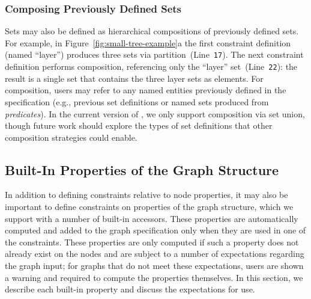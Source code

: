 \subsubsection{Composing Previously Defined Sets}
Sets may also be defined as hierarchical
compositions of previously defined sets. For example, in
Figure~\ref{fig:small-tree-example}a the first constraint definition
(named ``layer'') produces three sets via
partition~(Line~\texttt{17}). The next constraint definition performs 
composition, referencing only the ``layer'' set~(Line~\texttt{22}): the result
is a single set that contains the three layer sets as elements.
For composition, users may
refer to any named entities previously defined in the specification (e.g.,
previous set definitions or named sets produced from \emph{predicates}).
In the current version of \projectname, we only support composition via
set union, though future work should explore the types of set definitions
that other composition strategies could enable.

\subsection{Built-In Properties of the Graph Structure}
\label{sec:built-in-properties}

In addition to defining constraints relative to node properties, it may
also be important to define constraints on properties
of the graph structure, which we support with a number of built-in accessors.
These properties are automatically computed and added to the graph 
specification only when they are used in one of the \projectname constraints. 
These properties are only computed if such a property does not
already exist on the nodes and are subject to a number of expectations
regarding the graph input; for graphs that do not meet these expectations,
users are shown a warning and required to compute the properties
themselves. In this section, we describe each built-in property and discuss 
the expectations for use.


